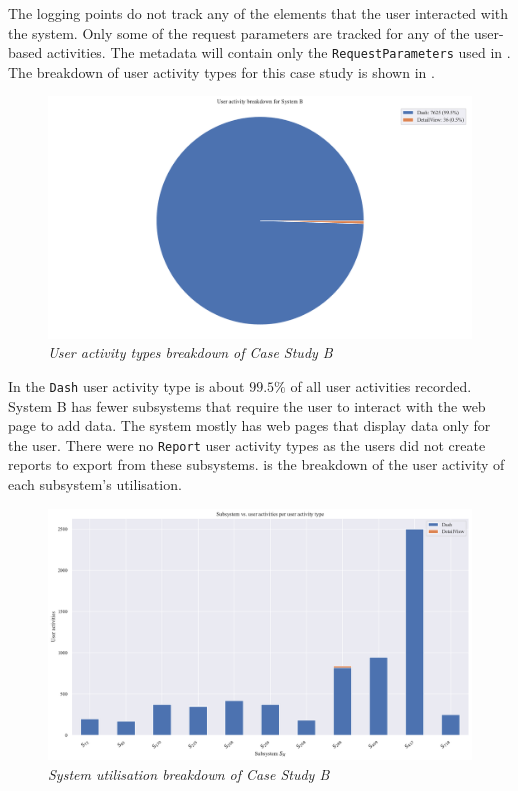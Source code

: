 The logging points do not track any of the elements that the user interacted with the system. Only some of the request parameters are tracked for any of the user-based activities. The metadata will contain only the \texttt{RequestParameters} used in . The breakdown of user activity types for this case study is shown in .

\begin{figure}[!htb]
	\centering %
	\includegraphics[width=0.95\linewidth]{img/ch3/analysis/case_B_breakdown.pdf}
	\caption[User activity types breakdown of Case Study B]
	{\textit{User activity types breakdown of Case Study B}}\label{fig:ch3_caseBBreakdown}
\end{figure}

In  the \texttt{Dash} user activity type is about $99.5\%$ of all user activities recorded. System B has fewer subsystems that require the user to interact with the web page to add data. The system mostly has web pages that display data only for the user. There were no \texttt{Report} user activity types as the users did not create reports to export from these subsystems.  is the breakdown of the user activity of each subsystem's utilisation.

\clearpage

\begin{figure}[!htb]
	\centering %
	\includegraphics[width=0.95\linewidth]{img/ch3/analysis/case_B_subsystems_1.pdf}
	\caption[System utilisation breakdown of Case Study B]
	{\textit{System utilisation breakdown of Case Study B}}\label{fig:ch3_caseBAnalysis}
\end{figure} 

